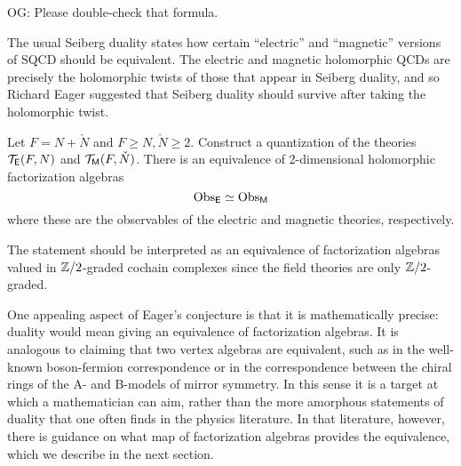 \documentclass[11pt]{amsart}
\def\SU{{\rm SU}}
\def\owen#1{{\textcolor{violet!65!black}{OG: {#1}}}}
\begin{document}
\owen{Please double-check that formula.}

The usual Seiberg duality states how certain ``electric'' and ``magnetic'' versions of SQCD should be equivalent.
The electric and magnetic holomorphic QCDs are precisely the holomorphic twists of those that appear in Seiberg duality,
and so Richard Eager suggested that Seiberg duality should survive after taking the holomorphic twist.

\begin{conj}
Let $F = N + \check{N}$ and $F \geq N, \check{N} \geq 2$.
Construct a quantization of the theories $\mathcal T_{\mathsf E}(F,N)$ and $\mathcal T_{{\sf M}}(F,\check{N})$.
There is an equivalence of 2-dimensional holomorphic factorization algebras
\[
{\rm Obs}_{\mathsf E} \simeq {\rm Obs}_{{\sf M}}  
\]
where these are the observables of the electric and magnetic theories, respectively.
\end{conj}

The statement should be interpreted as an equivalence of factorization algebras valued in $\mathbb Z/2$-graded cochain complexes since the field theories are only $\mathbb Z/2$-graded.

One appealing aspect of Eager's conjecture is that it is mathematically precise:
duality would mean giving an equivalence of factorization algebras.
It is analogous to claiming that two vertex algebras are equivalent,
such as in the well-known boson-fermion correspondence or in the correspondence between the chiral rings of the A- and B-models of mirror symmetry.
In this sense it is a target at which a mathematician can aim,
rather than the more amorphous statements of duality that one often finds in the physics literature.
In that literature, however, there is guidance on what map of factorization algebras provides the equivalence,
which we describe in the next section.
\end{document}
